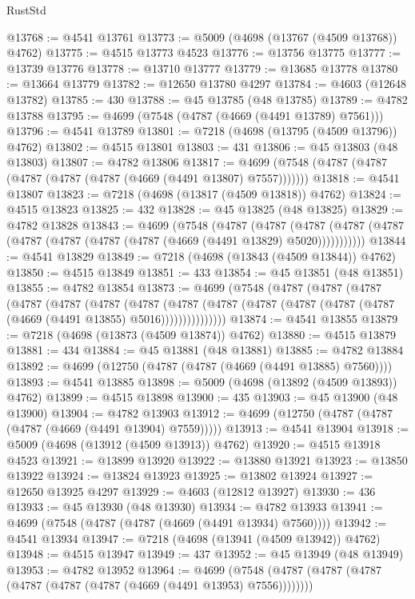 \begin{lexlean}{RustStd}
\begin{coremodule}
@13768 := @4541 @13761
@13773 := @5009 (@4698 (@13767 (@4509 @13768)) @4762)
@13775 := @4515 @13773 @4523
@13776 := @13756 @13775
@13777 := @13739 @13776
@13778 := @13710 @13777
@13779 := @13685 @13778
@13780 := @13664 @13779
@13782 := @12650 @13780 @4297
@13784 := @4603 (@12648 @13782)
@13785 := 430
@13788 := @45 @13785 (@48 @13785)
@13789 := @4782 @13788
@13795 := @4699 (@7548 (@4787 (@4669 (@4491 @13789) @7561)))
@13796 := @4541 @13789
@13801 := @7218 (@4698 (@13795 (@4509 @13796)) @4762)
@13802 := @4515 @13801
@13803 := 431
@13806 := @45 @13803 (@48 @13803)
@13807 := @4782 @13806
@13817 := @4699 (@7548 (@4787 (@4787 (@4787 (@4787 (@4787 (@4669 (@4491 @13807) @7557)))))))
@13818 := @4541 @13807
@13823 := @7218 (@4698 (@13817 (@4509 @13818)) @4762)
@13824 := @4515 @13823
@13825 := 432
@13828 := @45 @13825 (@48 @13825)
@13829 := @4782 @13828
@13843 := @4699
    (@7548
      (@4787
        (@4787
          (@4787 (@4787 (@4787 (@4787 (@4787 (@4787 (@4787 (@4669 (@4491 @13829) @5020)))))))))))
@13844 := @4541 @13829
@13849 := @7218 (@4698 (@13843 (@4509 @13844)) @4762)
@13850 := @4515 @13849
@13851 := 433
@13854 := @45 @13851 (@48 @13851)
@13855 := @4782 @13854
@13873 := @4699
    (@7548
      (@4787
        (@4787
          (@4787
            (@4787
              (@4787
                (@4787
                  (@4787
                    (@4787
                      (@4787 (@4787 (@4787 (@4787 (@4787 (@4669 (@4491 @13855) @5016)))))))))))))))
@13874 := @4541 @13855
@13879 := @7218 (@4698 (@13873 (@4509 @13874)) @4762)
@13880 := @4515 @13879
@13881 := 434
@13884 := @45 @13881 (@48 @13881)
@13885 := @4782 @13884
@13892 := @4699 (@12750 (@4787 (@4787 (@4669 (@4491 @13885) @7560))))
@13893 := @4541 @13885
@13898 := @5009 (@4698 (@13892 (@4509 @13893)) @4762)
@13899 := @4515 @13898
@13900 := 435
@13903 := @45 @13900 (@48 @13900)
@13904 := @4782 @13903
@13912 := @4699 (@12750 (@4787 (@4787 (@4787 (@4669 (@4491 @13904) @7559)))))
@13913 := @4541 @13904
@13918 := @5009 (@4698 (@13912 (@4509 @13913)) @4762)
@13920 := @4515 @13918 @4523
@13921 := @13899 @13920
@13922 := @13880 @13921
@13923 := @13850 @13922
@13924 := @13824 @13923
@13925 := @13802 @13924
@13927 := @12650 @13925 @4297
@13929 := @4603 (@12812 @13927)
@13930 := 436
@13933 := @45 @13930 (@48 @13930)
@13934 := @4782 @13933
@13941 := @4699 (@7548 (@4787 (@4787 (@4669 (@4491 @13934) @7560))))
@13942 := @4541 @13934
@13947 := @7218 (@4698 (@13941 (@4509 @13942)) @4762)
@13948 := @4515 @13947
@13949 := 437
@13952 := @45 @13949 (@48 @13949)
@13953 := @4782 @13952
@13964 := @4699 (@7548 (@4787 (@4787 (@4787 (@4787 (@4787 (@4787 (@4669 (@4491 @13953) @7556))))))))

\end{coremodule}
\end{lexlean}
